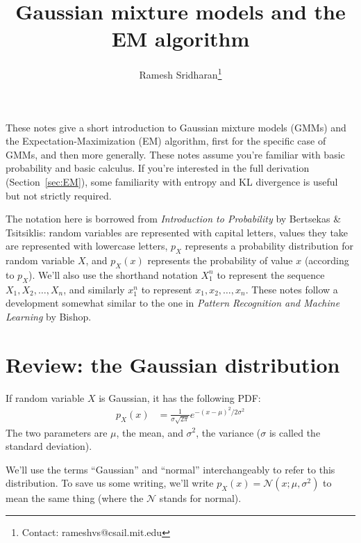 \documentclass[12pt]{article}
\title{Gaussian mixture models and the EM algorithm}
\author{Ramesh Sridharan\thanks{Contact: \mbox{rameshvs@csail.mit.edu}}}
\date{}
\begin{document}
    \maketitle
    These notes give a short introduction to Gaussian mixture models (GMMs) and
    the Expectation-Maximization (EM) algorithm, first for the specific case of
    GMMs, and then more generally. These notes assume you're familiar with basic
    probability and basic calculus. If you're interested in the full derivation
    (Section~\ref{sec:EM}), some familiarity with entropy and KL divergence
    is useful but not strictly required.

    The notation here is borrowed from \emph{Introduction to Probability} by
    Bertsekas \& Tsitsiklis: random variables are represented with capital
    letters, values they take are represented with lowercase letters, $p_X$
    represents a probability distribution for random variable $X$, and $p_X(x)$
    represents the probability of value $x$ (according to $p_X$). We'll also
    use the shorthand notation $X_1^{n}$ to represent the sequence $X_1, X_2,
    \ldots, X_n$, and similarly $x_1^n$ to represent $x_1, x_2, \ldots, x_n$.
    These notes follow a development somewhat similar to the one in
    \emph{Pattern Recognition and Machine Learning} by Bishop.


    \section{Review: the Gaussian distribution}
    If random variable $X$ is Gaussian, it has the following PDF:
    \begin{align*}
        p_X(x) &= \frac{1}{\sigma \sqrt{2\pi}} e^{-(x-\mu)^2/2\sigma^2}
    \end{align*}
    The two parameters are $\mu$, the mean, and $\sigma^2$, the variance ($\sigma$
    is called the standard deviation).

    We'll use the terms ``Gaussian'' and ``normal'' interchangeably to refer to
    this distribution.  To save us some writing, we'll write $p_X(x) =
    \mathcal{N}(x; \mu, \sigma^2)$ to mean the same thing (where the
    $\mathcal{N}$ stands for normal).
\end{document}
